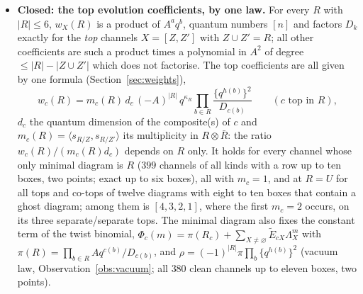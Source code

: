 \documentclass[11pt]{article}
\newcommand{\Lam}{\Lambda}
\newcommand{\Et}{\widetilde{E}}
\newcommand{\vac}{\varnothing}
\newcommand{\Rbar}{\bar R}
\begin{document}
\begin{itemize}
\item \textbf{Closed: the top evolution coefficients, by one law.}  For every $R$ with $|R|\le 6$, $w_X(R)$ is a
product of $A^aq^b$, quantum numbers $[n]$ and factors $D_k$ exactly for the \emph{top} channels $X=[Z,Z']$ with
$Z\cup Z'=R$; all other coefficients are such a product times a polynomial in $A^2$ of degree $\le |R|-|Z\cup Z'|$
which does not factorise.  The top coefficients are all given by one formula (Section~\ref{sec:weights}),
\[
w_c(R)=m_c(R)\,d_c\,(-A)^{|R|}\,q^{\kappa_R}\prod_{b\in R}\frac{\{q^{h(b)}\}^2}{D_{c(b)}}\qquad(c\text{ top in }R),
\]
$d_c$ the quantum dimension of the composite(s) of $c$ and $m_c(R)=\langle s_{R/Z},s_{R/Z'}\rangle$ its multiplicity in
$R\otimes\Rbar$: the ratio $w_c(R)/(m_c(R)d_c)$ depends on $R$ only.  It holds for every channel whose only minimal
diagram is $R$ ($399$ channels of all kinds with a row up to ten boxes, two points; exact up to six boxes), all with
$m_c=1$, and at $R=U$ for all tops and co-tops of twelve diagrams with eight to ten boxes that contain a ghost
diagram; among them is $[4,3,2,1]$, where the first $m_c=2$ occurs, on its three separate/separate tops.  The minimal
diagram also fixes the constant term of the twist binomial, $\Phi_c(m)=\pi(R_c)+\sum_{X\ne\vac}
\Et_{cX}\Lam_X^m$ with $\pi(R)=\prod_{b\in R}Aq^{c(b)}/D_{c(b)}$, and $\rho=(-1)^{|R|}\pi\prod_b\{q^{h(b)}\}^2$ (vacuum law,
Observation~\ref{obs:vacuum}; all $380$ clean channels up to eleven boxes, two points).


\end{itemize}
\end{document}
